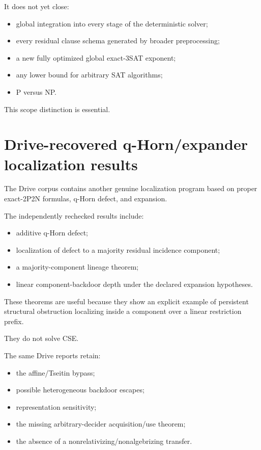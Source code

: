 \documentclass[11pt]{article}
\theoremstyle{plain}
\theoremstyle{definition}
\theoremstyle{remark}
\begin{document}
It does not yet close:
\begin{itemize}[leftmargin=1.4em]
\item global integration into every stage of the deterministic solver;
\item every residual clause schema generated by broader preprocessing;
\item a new fully optimized global exact-3SAT exponent;
\item any lower bound for arbitrary SAT algorithms;
\item P versus NP.
\end{itemize}

This scope distinction is essential.

\section{Drive-recovered q-Horn/expander localization results}

The Drive corpus contains another genuine localization program based on proper
exact-2P2N formulas, q-Horn defect, and expansion.

The independently rechecked results include:
\begin{itemize}[leftmargin=1.4em]
\item additive q-Horn defect;
\item localization of defect to a majority residual incidence component;
\item a majority-component lineage theorem;
\item linear component-backdoor depth under the declared expansion hypotheses.
\end{itemize}

These theorems are useful because they show an explicit example of persistent
structural obstruction localizing inside a component over a linear
restriction prefix.

They do not solve CSE.

The same Drive reports retain:
\begin{itemize}[leftmargin=1.4em]
\item the affine/Tseitin bypass;
\item possible heterogeneous backdoor escapes;
\item representation sensitivity;
\item the missing arbitrary-decider acquisition/use theorem;
\item the absence of a nonrelativizing/nonalgebrizing transfer.
\end{itemize}
\end{document}
